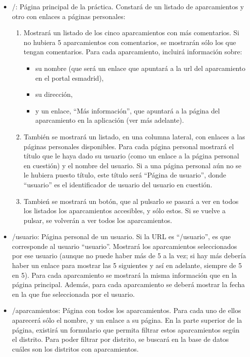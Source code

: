 \begin{itemize}
  \item /: Página principal de la práctica. Constará de un listado de aparcamientos y otro con enlaces a páginas personales:
  
  \begin{enumerate}
    \item Mostrará un listado de los cinco aparcamientos con más comentarios. Si no hubiera 5 aparcamientos con comentarios, se mostrarán sólo los que tengan comentarios. Para cada aparcamiento, incluirá información sobre:
    \begin{itemize}
      \item su nombre (que será un enlace que apuntará a la url del aparcamiento en el portal esmadrid), 
      \item su dirección,
      \item y un enlace, ``Más información'', que apuntará a la página del aparcamiento en la aplicación (ver más adelante).
    \end{itemize}
   
  \item También se mostrará un listado, en una columna lateral, con enlaces a las páginas personales disponibles. Para cada página personal mostrará el título que le haya dado su usuario (como un enlace a la página personal en cuestión) y el nombre del usuario. Si a una página personal aún no se le hubiera puesto título, este título será ``Página de usuario'', donde ``usuario'' es el identificador de usuario del usuario en cuestión.
    \item Tambień se mostrará un botón, que al pulsarlo se pasará a ver en todos los listados los aparcamientos accesibles, y sólo estos. Si se vuelve a pulsar, se volverán a ver todos los aparcamientos.
   \end{enumerate}

  \item /{usuario}: Página personal de un usuario. Si la URL es ``/usuario'', es que corresponde al usuario ``usuario''. Mostrará los aparcamientos seleccionados por ese usuario (aunque no puede haber más de 5 a la vez; si hay más debería haber un enlace para mostrar las 5 siguientes y así en adelante, siempre de 5 en 5). Para cada aparcamiento se mostrará la misma información que en la página principal. Además, para cada aparcamiento se deberá mostrar la fecha en la que fue seleccionada por el usuario.

  \item /aparcamientos: Página con todos los aparcamientos. Para cada uno de ellos aparecerá sólo el nombre, y un enlace a su página. En la parte superior de la página, existirá un formulario que permita filtrar estos aparcamientos según el distrito. Para poder filtrar por distrito, se buscará en la base de datos cuáles son los distritos con aparcamientos.


\end{itemize}
